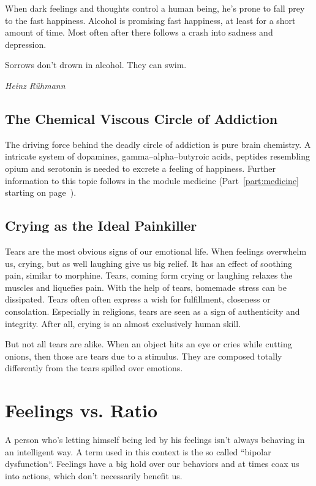 \documentclass[../Book.Stress_regulation.tex]{subfiles}
\begin{document}
When dark feelings and thoughts control a human being, he's prone to fall prey to the fast happiness.
Alcohol is promising fast happiness, at least for a short amount of time.
Most often after  there follows a crash into sadness and depression.

\epigraph{Sorrows don't drown in alcohol. They can swim.}{\textit{Heinz R\"uhmann}}

\section{The Chemical Viscous Circle of Addiction}

The driving force behind the deadly circle of addiction is pure brain chemistry.
A intricate system of dopamines, gamma--alpha--butyroic acids, peptides resembling opium and serotonin is needed to excrete a feeling of happiness.
Further information to this topic follows in the module medicine
(Part~\ref{part:medicine} starting on page~\pageref{part:medicine}). %

\section{Crying as the Ideal Painkiller}

Tears are the most obvious signs of our emotional life.
When feelings overwhelm us, crying, but as well laughing give us big relief.
It has an effect of soothing pain, similar to morphine.
Tears, coming form crying or laughing relaxes the muscles and liquefies pain.
With the help of tears, homemade stress can be dissipated.
Tears often often express a wish for fulfillment, closeness or consolation.
Especially in religions, tears are seen as a sign of authenticity and integrity.
After all, crying is an almost exclusively human skill.

But not all tears are alike.
When an object hits an eye or cries while cutting onions, then those are tears due to a stimulus.
They are composed totally differently from the tears spilled over emotions.

\chapter{Feelings vs.  Ratio}

A person who's letting himself being led by his feelings isn't always behaving in an intelligent way.
A term used in this context is the so called ``bipolar dysfunction``.
Feelings have a big hold over our behaviors and at times coax us into actions, which don't necessarily benefit us.
\end{document}
